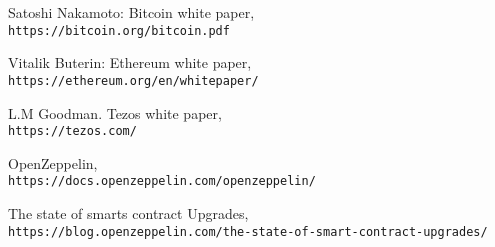 \begin{thebibliography}{9}

Satoshi Nakamoto: Bitcoin white paper,
\\\texttt{https://bitcoin.org/bitcoin.pdf}

Vitalik Buterin: Ethereum white paper,
\\\texttt{https://ethereum.org/en/whitepaper/}

L.M Goodman. Tezos white paper,
\\\texttt{https://tezos.com/}

OpenZeppelin,
\\\texttt{https://docs.openzeppelin.com/openzeppelin/}

The state of smarts contract Upgrades,
\\\texttt{https://blog.openzeppelin.com/the-state-of-smart-contract-upgrades/}

\end{thebibliography}
